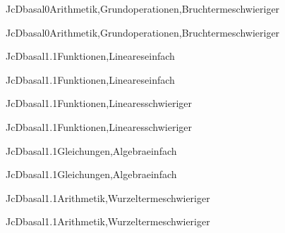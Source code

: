 \documentclass[12pt]{article}
\begin{document}
\begin{Add}{JcD}{basal0}{Arithmetik,Grundoperationen,Bruchterme}{schwieriger}
\solution{ }
\end{Add}
\begin{Add}{JcD}{basal0}{Arithmetik,Grundoperationen,Bruchterme}{schwieriger}
\end{Add}

\begin{Add}{JcD}{basal1.1}{Funktionen,Lineares}{einfach}
\solution{ }
\end{Add}
\begin{Add}{JcD}{basal1.1}{Funktionen,Lineares}{einfach}
\end{Add}

        \begin{Add}{JcD}{basal1.1}{Funktionen,Lineares}{schwieriger}
        \solution{ }
        \end{Add}
        \begin{Add}{JcD}{basal1.1}{Funktionen,Lineares}{schwieriger}
        \end{Add}
        

\begin{Add}{JcD}{basal1.1}{Gleichungen,Algebra}{einfach}
\solution{ }
\end{Add}
\begin{Add}{JcD}{basal1.1}{Gleichungen,Algebra}{einfach}
\end{Add}

\begin{Add}{JcD}{basal1.1}{Arithmetik,Wurzelterme}{schwieriger}
\solution{ }
\end{Add}
\begin{Add}{JcD}{basal1.1}{Arithmetik,Wurzelterme}{schwieriger}
\end{Add}
\end{document}
